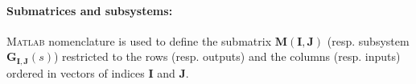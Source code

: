 \documentclass[smallcondensed]{svjour3}     %
\newcommand{\matlab}{\textsc{Matlab }}
\begin{document}
\paragraph{Submatrices and subsystems:} \matlab  nomenclature is used to define the submatrix $\mathbf{M}(\mathbf{I},\mathbf{J})$ (resp. subsystem $\mathbf{G}_{\mathbf{I},\mathbf{J}}(s)$) restricted to the rows (resp. outputs) and the columns (resp. inputs) ordered in vectors of indices $\mathbf{I}$ and $\mathbf{J}$. 
%
\end{document}
